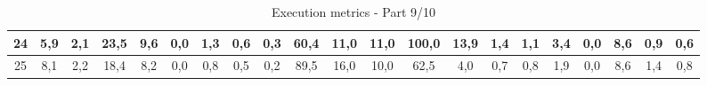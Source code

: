 \begin{sidewaystable}[]
\begin{tabular}{|c|c|c|c|c|c|c|c|c|c|c|c|c|c|c|c|c|c|c|c|c|}
    24 & 5,9                                              & 2,1                                              & 23,5                                             & 9,6                                              & 0,0                                              & 1,3                                              & 0,6                                              & 0,3                                              & 60,4                                            & 11,0                                            & 11,0                                            & 100,0                                           & 13,9                                            & 1,4                                             & 1,1                                             & 3,4                                             & 0,0                                             & 8,6                                              & 0,9                                              &  0,6                                               \\ \hline
    25 & 8,1                                              & 2,2                                              & 18,4                                             & 8,2                                              & 0,0                                              & 0,8                                              & 0,5                                              & 0,2                                              & 89,5                                            & 16,0                                            & 10,0                                            & 62,5                                            & 4,0                                             & 0,7                                             & 0,8                                             & 1,9                                             & 0,0                                             & 8,6                                              & 1,4                                              &  0,8                                               \\ \hline
    \end{tabular}
    \caption{Execution metrics - Part 9/10}
    \label{tab:ap:exec_metrics_9}
\end{sidewaystable}

